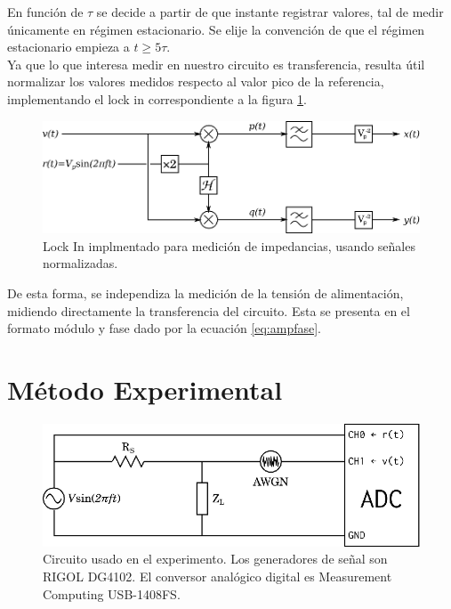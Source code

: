 \documentclass[11pt,a4paper]{extarticle}
\begin{document}
\begin{multicols}{2}
En función de $\tau$ se decide a partir de que instante registrar valores, tal de medir únicamente en régimen estacionario. Se elije la convención de que el régimen estacionario empieza a $t \ge 5\tau$.\\


Ya que lo que interesa medir en nuestro circuito es transferencia, resulta útil normalizar los valores medidos respecto al valor pico de la referencia, implementando el lock in correspondiente a la figura \ref{fig:nuestro_lockin}.

\begin{figure}[H]
	\centering
	\includegraphics[width=\linewidth]{Images/nuestro_lockin.eps}
	\caption{Lock In implmentado para medición de impedancias, usando señales normalizadas.}
	\label{fig:nuestro_lockin}
\end{figure}

De esta forma, se independiza la medición de la tensión de alimentación, midiendo directamente la transferencia del circuito. 
Esta se presenta en el formato módulo y fase dado por la ecuación \ref{eq:ampfase}.

\section{Método Experimental}

\begin{figure}[H]
	\centering
	\includegraphics[width=\linewidth]{Images/circuito.eps}
	\caption{Circuito usado en el experimento. Los generadores de señal son RIGOL DG4102. El conversor analógico digital es Measurement Computing USB-1408FS.}
	\label{fig:circuito}
\end{figure}


\end{multicols}
\end{document}
